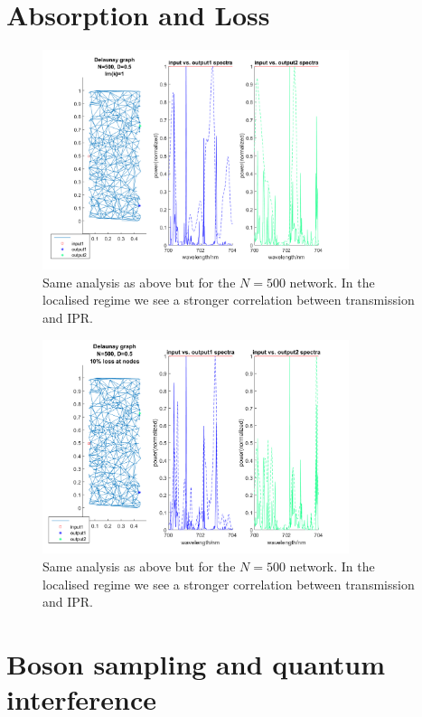 \section{Absorption and Loss}

\begin{figure}[h]
  \centering
    \includegraphics[width=0.8\textwidth]{ch3/fig3/edge_loss.png}
    \caption{Same analysis as above but for the $N=500$ network. In the localised regime we see a stronger correlation between transmission and IPR.} 
    \label{fig:edge_loss}
\end{figure}

\begin{figure}[h]
  \centering
    \includegraphics[width=0.8\textwidth]{ch3/fig3/node_loss.png}
    \caption{Same analysis as above but for the $N=500$ network. In the localised regime we see a stronger correlation between transmission and IPR.} 
    \label{fig:node_loss}
\end{figure}


\section{Boson sampling and quantum interference}
